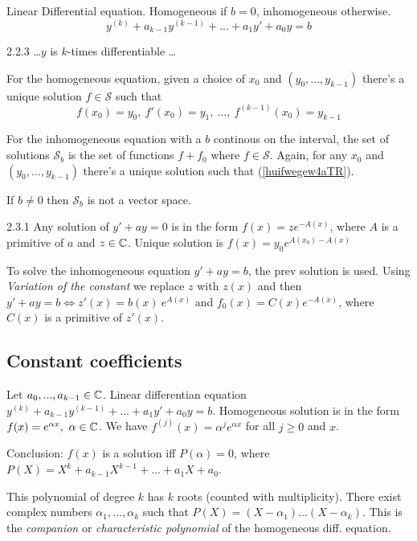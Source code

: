 \begin{definition}
    Linear Differential equation. Homogeneous if  $b = 0$, inhomogeneous otherwise.
    \[ y^{(k)} + a_{k-1} y^{(k-1)} + ... + a_1 y' + a_0 y = b \]
\end{definition}

\begin{theorem}{2.2.3}
    \dots $y$ is $k$-times differentiable \dots

    For the homogeneous equation, given a choice of $x_0$ and $(y_0, ..., y_{k-1})$
    there's a unique solution $f \in \mathcal{S}$ such that
    \begin{equation}\label{huifwegew4aTR} f(x_0) = y_0,\ f'(x_0) = y_1,\ \dots,\ f^{(k-1)}(x_0) = y_{k-1}  \end{equation}

    For the inhomogeneous equation with a $b$ continous on the interval, the set of solutions $\mathcal{S}_b$
    is the set of functions $f + f_0$ where $f \in \mathcal{S}$. Again, for any $x_0$ and $(y_0, ..., y_{k-1})$
    there's a unique solution such that (\ref{huifwegew4aTR}).

    If $b \ne 0$ then $\mathcal{S}_b$ is not a vector space.
\end{theorem}

\begin{proposition}{2.3.1}
    Any solution of $y' + ay = 0$ is in the form $f(x) = z e^{-A(x)}$, where $A$ is a primitive of $a$ and $z \in \mathbb{C}$.
    Unique solution is $f(x) = y_0 e^{A(x_0) - A(x)}$
\end{proposition}

To solve the inhomogeneous equation $y' + ay = b$, the prev solution is used.
Using \textit{Variation of the constant} we replace $z$ with $z(x)$ and then
$y' + ay = b \Leftrightarrow z'(x) = b(x)\ e^{A(x)}$ and $f_0(x) = C(x) e^{-A(x)}$, where
$C(x)$ is a primitive of $z'(x)$.

\subsection{Constant coefficients}
\begin{definition}
    Let $a_0, ..., a_{k-1} \in \mathbb{C}$. Linear differentian equation $y^{(k)} + a_{k-1}y^{(k-1)} + ... + a_1y' + a_0y = b$.
    Homogeneous solution is in the form $f(x) = e^{\alpha x},\ \alpha \in \mathbb{C}$. We have $f^{(j)}(x) = \alpha^j e^{\alpha x}$ for all $j \ge 0$ and $x$.

    Conclusion: $f(x)$ is a solution iff $P(\alpha) = 0$, where $P(X) = X^k + a_{k-1}X^{k-1} + ... + a_1X + a_0$.

    This polynomial of degree $k$ has $k$ roots (counted with multiplicity). There exist complex numbers $\alpha_1, ..., \alpha_k$
    such that $P(X) = (X - \alpha_1)...(X - \alpha_k)$. This is the \textit{companion} or \textit{characteristic polynomial} of the
    homogeneous diff. equation.
\end{definition}

